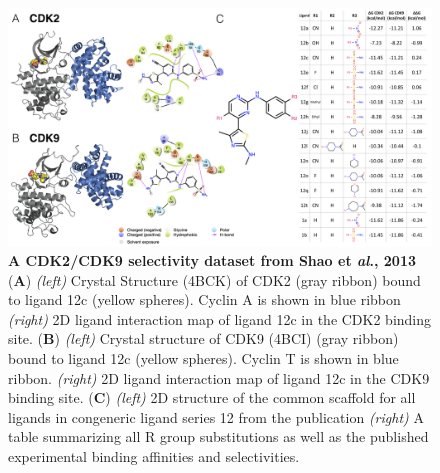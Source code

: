 \documentclass[9pt,lineno]{elife-modified} %
\begin{document}
\begin{figure}
\begin{fullwidth}
\begin{centering}
\includegraphics[width=1.0\linewidth]{figures/figure2.png}
\end{centering}
\caption{
\label{fig:figure-2}
{\bf A CDK2/CDK9 selectivity dataset from Shao et \emph{al}., 2013} \\
({\bf A})  \emph{(left)} Crystal Structure (4BCK)\citep{Hole2013-sr} of CDK2 (gray ribbon)  bound to ligand 12c (yellow spheres). Cyclin A is shown in blue ribbon \emph{(right)} 2D ligand interaction map of ligand 12c in the CDK2 binding site. 
({\bf B}) \emph{(left)} Crystal structure of CDK9 (4BCI)\citep{Hole2013-sr} (gray ribbon) bound to ligand 12c (yellow spheres). Cyclin T is shown in blue ribbon. \emph{(right)} 2D ligand interaction map of ligand 12c in the CDK9 binding site.
({\bf C}) \emph{(left)} 2D structure of the common scaffold for all ligands in congeneric ligand series 12 from the publication \emph{(right)} A table summarizing all R group substitutions as well as the published experimental binding affinities and selectivities\citep{Shao2013-oe}. 
}
\end{fullwidth}
\end{figure}
\end{document}
